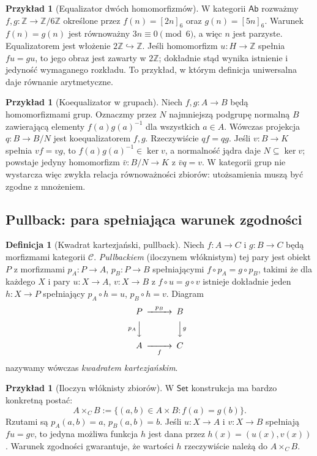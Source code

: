 \documentclass[11pt,a4paper]{article}
\numberwithin{equation}{section}
\theoremstyle{plain}
\theoremstyle{definition}
\newtheorem{definicja}[twierdzenie]{Definicja}
\newtheorem{przyklad}[twierdzenie]{Przykład}
\theoremstyle{remark}
\newcommand{\cat}[1]{\mathsf{#1}}
\newcommand{\Set}{\cat{Set}}
\newcommand{\Ab}{\cat{Ab}}
\newcommand{\Ker}{\operatorname{ker}}
\begin{document}
\begin{przyklad}[Equalizator dwóch homomorfizmów]
W kategorii $\Ab$ rozważmy $f,g:\mathbb Z\to\mathbb Z/6\mathbb Z$ określone przez $f(n)=[2n]_6$ oraz $g(n)=[5n]_6$. Warunek $f(n)=g(n)$ jest równoważny $3n\equiv0\pmod 6$, a więc $n$ jest parzyste. Equalizatorem jest włożenie $2\mathbb Z\hookrightarrow\mathbb Z$. Jeśli homomorfizm $u:H\to\mathbb Z$ spełnia $fu=gu$, to jego obraz jest zawarty w $2\mathbb Z$; dokładnie stąd wynika istnienie i jedyność wymaganego rozkładu. To przykład, w którym definicja uniwersalna daje równanie arytmetyczne.
\end{przyklad}

\begin{przyklad}[Koequalizator w grupach]
Niech $f,g:A\to B$ będą homomorfizmami grup. Oznaczmy przez $N$ najmniejszą podgrupę normalną $B$ zawierającą elementy $f(a)g(a)^{-1}$ dla wszystkich $a\in A$. Wówczas projekcja $q:B\to B/N$ jest koequalizatorem $f,g$. Rzeczywiście $qf=qg$. Jeśli $v:B\to K$ spełnia $vf=vg$, to $f(a)g(a)^{-1}\in\Ker v$, a normalność jądra daje $N\subseteq\Ker v$; powstaje jedyny homomorfizm $\bar v:B/N\to K$ z $\bar vq=v$. W kategorii grup nie wystarcza więc zwykła relacja równoważności zbiorów: utożsamienia muszą być zgodne z mnożeniem.
\end{przyklad}


\subsection{Pullback: para spełniająca warunek zgodności}

\begin{definicja}[Kwadrat kartezjański, pullback]\label{def:pullback}
Niech $f:A\to C$ i $g:B\to C$ będą morfizmami kategorii $\mathcal C$. \emph{Pullbackiem} (iloczynem włóknistym) tej pary jest obiekt $P$ z morfizmami $p_A:P\to A$, $p_B:P\to B$ spełniającymi $f\circ p_A=g\circ p_B$, takimi że dla każdego $X$ i pary $u:X\to A$, $v:X\to B$ z $f\circ u=g\circ v$ istnieje dokładnie jeden $h:X\to P$ spełniający $p_A\circ h=u$, $p_B\circ h=v$. Diagram
\[
\begin{CD}
P @>{p_B}>> B\\
@V{p_A}VV @VV{g}V\\
A @>>{f}> C
\end{CD}
\]
nazywamy wówczas \emph{kwadratem kartezjańskim}.
\end{definicja}

\begin{przyklad}[Iloczyn włóknisty zbiorów]\label{przyklad:włokna}
W $\Set$ konstrukcja ma bardzo konkretną postać:
\[
A\times_C B:=\{(a,b)\in A\times B:f(a)=g(b)\}.
\]
Rzutami są $p_A(a,b)=a$, $p_B(a,b)=b$. Jeśli $u:X\to A$ i $v:X\to B$ spełniają $fu=gv$, to jedyna możliwa funkcja $h$ jest dana przez $h(x)=(u(x),v(x))$. Warunek zgodności gwarantuje, że wartości $h$ rzeczywiście należą do $A\times_C B$.
\end{przyklad}
\end{document}
